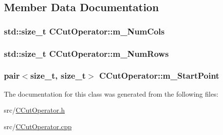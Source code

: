 \subsection{Member Data Documentation}
\subsubsection[{\texorpdfstring{m\+\_\+\+Num\+Cols}{m_NumCols}}]{\setlength{\rightskip}{0pt plus 5cm}std\+::size\+\_\+t C\+Cut\+Operator\+::m\+\_\+\+Num\+Cols\hspace{0.3cm}{\ttfamily [private]}}\hypertarget{classCCutOperator_a79665dc45c36827946d70561b17972e1}{}\label{classCCutOperator_a79665dc45c36827946d70561b17972e1}
\subsubsection[{\texorpdfstring{m\+\_\+\+Num\+Rows}{m_NumRows}}]{\setlength{\rightskip}{0pt plus 5cm}std\+::size\+\_\+t C\+Cut\+Operator\+::m\+\_\+\+Num\+Rows\hspace{0.3cm}{\ttfamily [private]}}\hypertarget{classCCutOperator_af8d34f5712a90c9969823f75a719dc1b}{}\label{classCCutOperator_af8d34f5712a90c9969823f75a719dc1b}
\subsubsection[{\texorpdfstring{m\+\_\+\+Start\+Point}{m_StartPoint}}]{\setlength{\rightskip}{0pt plus 5cm}pair$<$size\+\_\+t, size\+\_\+t$>$ C\+Cut\+Operator\+::m\+\_\+\+Start\+Point\hspace{0.3cm}{\ttfamily [private]}}\hypertarget{classCCutOperator_aa58b7138e83bd58cc64f8fac3325ce80}{}\label{classCCutOperator_aa58b7138e83bd58cc64f8fac3325ce80}


The documentation for this class was generated from the following files\+:\begin{DoxyCompactItemize}
\item 
src/\hyperlink{CCutOperator_8h}{C\+Cut\+Operator.\+h}\item 
src/\hyperlink{CCutOperator_8cpp}{C\+Cut\+Operator.\+cpp}\end{DoxyCompactItemize}
